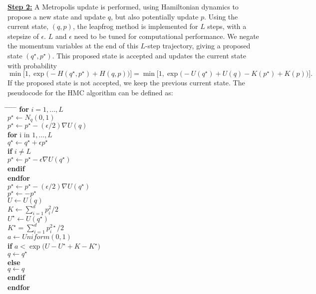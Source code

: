 \documentclass[twoside]{article}
\begin{document}
\underline{\textbf{Step 2:}} A Metropolis update is performed, using Hamiltonian dynamics to propose a new state and update $q$, but also potentially update $p$. Using the current state, $(q,p)$, the leapfrog method is implemented for $L$ steps, with a stepsize of $\epsilon$. $L$ and $\epsilon$ need to be tuned for computational performance. We negate the momentum variables at the end of this $L$-step trajectory, giving a proposed state $(q^{\star},p^{\star})$. This proposed state is accepted and updates the current state with probability
$$\min \Big[1,\exp \big(-H(q^{\star},p^{\star}) + H(q,p)\big)\Big] = \min \Big[1,\exp \big(-U(q^{\star}) + U(q) - K(p^{\star}) + K(p)\big) \Big].$$
If the proposed state is not accepted, we keep the previous current state. The pseudocode for the HMC algorithm can be defined as:
\begin{tabbing}
\hspace*{.25in} \= \hspace*{.25in} \= \hspace*{.25in} \= \hspace*{.25in} \= \hspace*{.25in} \=\kill
\> \textbf{for} $i =1,\ldots,L$ \\
\>\> $p^{\star} \leftarrow N_q(0, 1)$ \\
\>\> $p^{\star} \leftarrow p^{\star} - (\epsilon/2)\nabla U(q)$\\
\>\> \textbf{for} i in $1,\ldots,L$ \\
\>\>\> $q^{\star} \leftarrow q^{\star} + \epsilon p^{\star}$ \\
\>\>\> \textbf{if} $i \neq L$ \\
\>\>\>\> $p^{\star} \leftarrow p^{\star} - \epsilon \nabla U(q^{\star})$ \\
\>\>\> \textbf{endif} \\
\>\> \textbf{endfor} \\
\>\> $p^{\star} \leftarrow p^{\star} - (\epsilon/2) \nabla U(q^{\star})$ \\
\>\> $p^{\star} \leftarrow -p^{\star}$ \\
\>\> $U \leftarrow U(q)$ \\
\>\> $K \leftarrow \sum_{i=1}^d p_i^2/2$ \\
\>\> $U^{\star} \leftarrow U(q^{\star})$ \\
\>\> $K^{\star} = \sum_{i=1}^d p^{2\star}_i/2$ \\
\>\> $a \leftarrow Uniform(0,1)$ \\
\>\> \textbf{if} $a < \exp\big(U - U^{\star} + K - K^{\star}\big)$ \\
\>\>\> $q \leftarrow q^{\star}$\\
\>\> \textbf{else} \\
\>\>\> $q \leftarrow q$ \\
\>\> \textbf{endif} \\
\> \textbf{endfor}
\end{tabbing}





\end{document}
